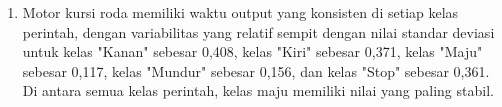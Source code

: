 \begin{enumerate}
  \item Motor kursi roda memiliki waktu output yang konsisten di setiap kelas perintah, dengan variabilitas yang relatif sempit dengan nilai standar deviasi untuk kelas "Kanan" sebesar 0,408, kelas "Kiri" sebesar 0,371, kelas "Maju" sebesar 0,117, kelas "Mundur" sebesar 0,156, dan kelas "Stop" sebesar 0,361. Di antara semua kelas perintah, kelas maju memiliki nilai yang paling stabil.

\end{enumerate}
